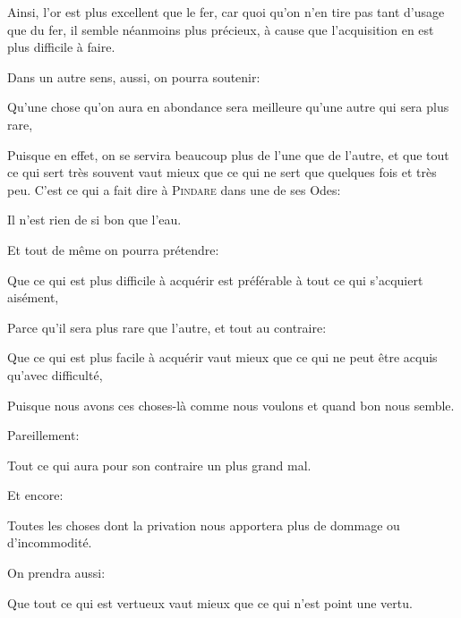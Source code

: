 Ainsi, l'or est plus excellent que le fer, car quoi qu'on n'en tire pas tant d'usage que du fer, il semble néanmoins plus
précieux, à cause que l'acquisition en est plus difficile à faire.

Dans un autre sens, aussi, on pourra soutenir:

\begin{lieu}
	Qu'une chose qu'on aura en abondance sera meilleure qu'une autre qui sera plus rare,
\end{lieu}

Puisque en effet, on se servira beaucoup plus de l'une que de l'autre, et que tout ce qui sert très souvent vaut mieux que
ce qui ne sert que quelques fois et très peu. C'est ce qui a fait dire à \textsc{Pindare} dans une de ses Odes:

\begin{emphpar}
	Il n'est rien de si bon que l'eau.
\end{emphpar}

\bigbreak

Et tout de même on pourra prétendre:

\begin{lieu}
	Que ce qui est plus difficile à acquérir est préférable à tout ce qui s'acquiert aisément,
\end{lieu}

Parce qu'il sera plus rare que l'autre, et tout au contraire:

\begin{lieu}
	Que ce qui est plus facile à acquérir vaut mieux que ce qui ne peut être acquis qu'avec difficulté,
\end{lieu}

Puisque nous avons ces choses-là comme nous voulons et quand bon nous semble.

\bigbreak

Pareillement:

\begin{lieu}
	Tout ce qui aura pour son contraire un plus grand mal.
\end{lieu}

\bigbreak

Et encore:

\begin{lieu}
	Toutes les choses dont la privation nous apportera plus de dommage ou d'incommodité.
\end{lieu}

\bigbreak

On prendra aussi:

\begin{lieu}
	Que tout ce qui est vertueux vaut mieux que ce qui n'est point une vertu.
\end{lieu}

